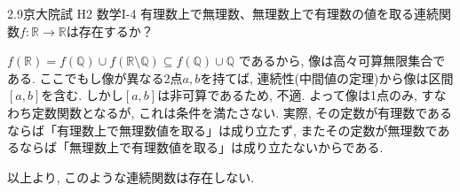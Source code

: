 \begin{prob}{2.9}{}{京大院試 H2 数学I-4}
有理数上で無理数、無理数上で有理数の値を取る連続関数$f:\mathbb{R}\to\mathbb{R}$は存在するか？
\end{prob}

$f(\mathbb{R}) = f(\mathbb{Q}) \cup f(\mathbb{R} \setminus \mathbb{Q}) \subseteq f(\mathbb{Q}) \cup \mathbb{Q}$
であるから, 像は高々可算無限集合である.
ここでもし像が異なる2点$a,b$を持てば, 連続性(中間値の定理)から像は区間$[a,b]$を含む.
しかし$[a,b]$は非可算であるため, 不適. よって像は1点のみ, すなわち定数関数となるが, これは条件を満たさない.
実際, その定数が有理数であるならば「有理数上で無理数値を取る」は成り立たず,
またその定数が無理数であるならば「無理数上で有理数値を取る」は成り立たないからである.

以上より, このような連続関数は存在しない. 
